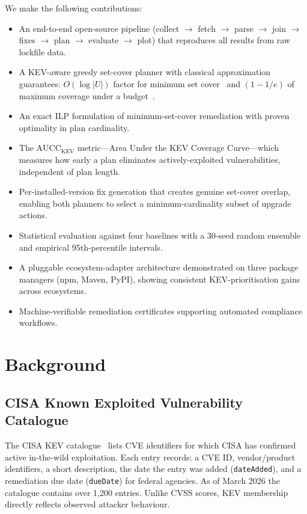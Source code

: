 \documentclass[conference]{IEEEtran}
\newcommand{\aucc}{$\mathrm{AUCC}_{\mathrm{KEV}}$\xspace}
\begin{document}
We make the following contributions:
\begin{itemize}
  \item An end-to-end open-source pipeline (collect $\to$ fetch $\to$
        parse $\to$ join $\to$ fixes $\to$ plan $\to$ evaluate $\to$
        plot) that reproduces all results from raw lockfile data.
  \item A KEV-aware greedy set-cover planner with classical approximation
        guarantees: $O(\log|U|)$ factor for minimum set cover~\cite{johnson74}
        and $(1-1/e)$ of maximum coverage under a budget~\cite{nemhauser78}.
  \item An exact ILP formulation of minimum-set-cover remediation with
        proven optimality in plan cardinality.
  \item The \aucc metric---Area Under the KEV Coverage Curve---which
        measures how early a plan eliminates actively-exploited
        vulnerabilities, independent of plan length.
  \item Per-installed-version fix generation that creates genuine
        set-cover overlap, enabling both planners to select a
        minimum-cardinality subset of upgrade actions.
  \item Statistical evaluation against four baselines with a 30-seed
        random ensemble and empirical 95th-percentile intervals.
  \item A pluggable ecosystem-adapter architecture demonstrated on three
        package managers (npm, Maven, PyPI), showing consistent
        KEV-prioritisation gains across ecosystems.
  \item Machine-verifiable remediation certificates supporting
        automated compliance workflows.
\end{itemize}

\section{Background}
\label{sec:background}

\subsection{CISA Known Exploited Vulnerability Catalogue}

The CISA KEV catalogue~\cite{cisa_kev} lists CVE identifiers for which
CISA has confirmed active in-the-wild exploitation.  Each entry records:
a CVE ID, vendor/product identifiers, a short description, the date the
entry was added (\texttt{dateAdded}), and a remediation due date
(\texttt{dueDate}) for federal agencies.  As of March 2026 the catalogue
contains over 1,200 entries.  Unlike CVSS scores, KEV membership
directly reflects observed attacker behaviour.
\end{document}

